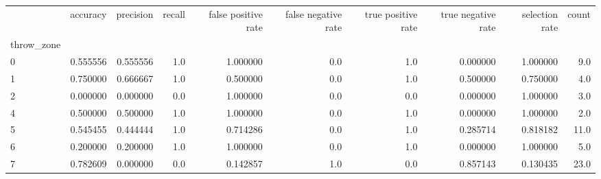\begin{tabular}{lrrrrrrrrr}
\toprule
{} &  accuracy &  precision &  recall &  false positive rate &  false negative rate &  true positive rate &  true negative rate &  selection rate &  count \\
throw\_zone &           &            &         &                      &                      &                     &                     &                 &        \\
\midrule
0          &  0.555556 &   0.555556 &     1.0 &             1.000000 &                  0.0 &                 1.0 &            0.000000 &        1.000000 &    9.0 \\
1          &  0.750000 &   0.666667 &     1.0 &             0.500000 &                  0.0 &                 1.0 &            0.500000 &        0.750000 &    4.0 \\
2          &  0.000000 &   0.000000 &     0.0 &             1.000000 &                  0.0 &                 0.0 &            0.000000 &        1.000000 &    3.0 \\
4          &  0.500000 &   0.500000 &     1.0 &             1.000000 &                  0.0 &                 1.0 &            0.000000 &        1.000000 &    2.0 \\
5          &  0.545455 &   0.444444 &     1.0 &             0.714286 &                  0.0 &                 1.0 &            0.285714 &        0.818182 &   11.0 \\
6          &  0.200000 &   0.200000 &     1.0 &             1.000000 &                  0.0 &                 1.0 &            0.000000 &        1.000000 &    5.0 \\
7          &  0.782609 &   0.000000 &     0.0 &             0.142857 &                  1.0 &                 0.0 &            0.857143 &        0.130435 &   23.0 \\
\bottomrule
\end{tabular}

